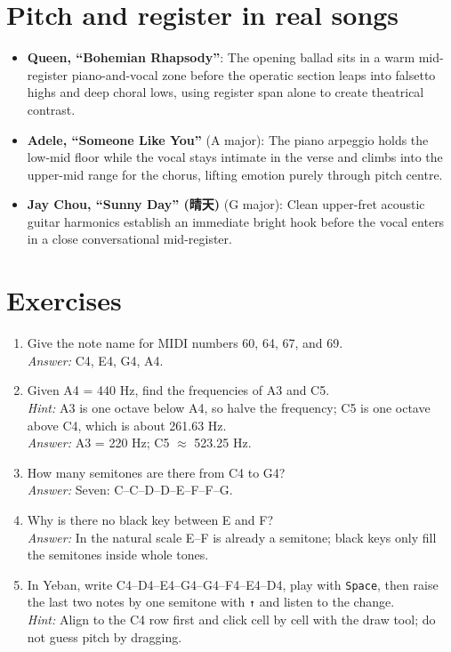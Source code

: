 \section{Pitch and register in real songs}

\begin{itemize}
  \item \textbf{Queen, ``Bohemian Rhapsody''}: The opening ballad sits in a warm mid-register piano-and-vocal zone before the operatic section leaps into falsetto highs and deep choral lows, using register span alone to create theatrical contrast.
  \item \textbf{Adele, ``Someone Like You''} (A major): The piano arpeggio holds the low-mid floor while the vocal stays intimate in the verse and climbs into the upper-mid range for the chorus, lifting emotion purely through pitch centre.
  \item \textbf{Jay Chou, ``Sunny Day'' (晴天)} (G major): Clean upper-fret acoustic guitar harmonics establish an immediate bright hook before the vocal enters in a close conversational mid-register.
\end{itemize}

\section{Exercises}


\begin{exercise}
\begin{enumerate}
  \item Give the note name for MIDI numbers 60, 64, 67, and 69.\\
  \emph{Answer:} C4, E4, G4, A4.
  \item Given A4 = 440 Hz, find the frequencies of A3 and C5.\\
  \emph{Hint:} A3 is one octave below A4, so halve the frequency; C5 is one octave above C4, which is about 261.63 Hz.\\
  \emph{Answer:} A3 = 220 Hz; C5 $\approx$ 523.25 Hz.
  \item How many semitones are there from C4 to G4?\\
  \emph{Answer:} Seven: C–C\sharpsym–D–D\sharpsym–E–F–F\sharpsym–G.
  \item Why is there no black key between E and F?\\
  \emph{Answer:} In the natural scale E–F is already a semitone; black keys only fill the semitones inside whole tones.
  \item In Yeban, write C4–D4–E4–G4–G4–F4–E4–D4, play with \texttt{Space}, then raise the last two notes by one semitone with \texttt{↑} and listen to the change.\\
  \emph{Hint:} Align to the C4 row first and click cell by cell with the draw tool; do not guess pitch by dragging.
\end{enumerate}
\end{exercise}

